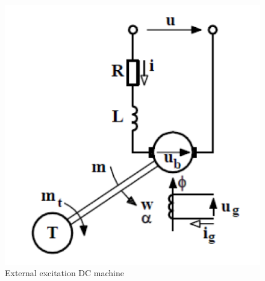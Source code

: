 \begin{figure}[htb]
\begingroup
\tikzset{}
 \centerline{\includegraphics[width=.35\columnwidth]{.//Figure/dc_mot_veszpr.png}}
 \endgroup
 \caption{External excitation DC machine}
 \label{fig:dc_machine}
\end{figure}